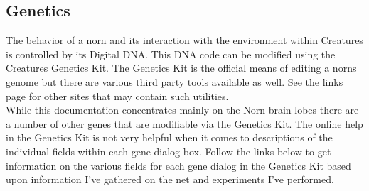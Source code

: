 \documentclass[11pt,twoside,a4paper]{article}
\begin{document}
\subsection{Genetics} %

The behavior of a norn and its interaction with the environment within Creatures is controlled by its Digital DNA. This DNA code can be modified using the Creatures Genetics Kit. The Genetics Kit is the official means of editing a norns genome but there are various third party tools available as well. See the links page for other sites that may contain such utilities.~\\

While this documentation concentrates mainly on the Norn brain lobes there are a number of other genes that are modifiable via the Genetics Kit. The online help in the Genetics Kit is not very helpful when it comes to descriptions of the individual fields within each gene dialog box. Follow the links below to get information on the various fields for each gene dialog in the Genetics Kit based upon information I've gathered on the net and experiments I've performed.~\\
\end{document}
